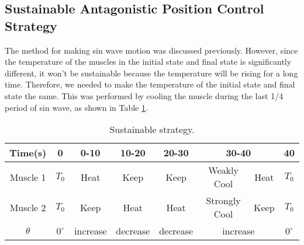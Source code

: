 


\subsection{Sustainable Antagonistic Position Control Strategy}\label{section_simulation}
The method for making sin wave motion was discussed previously. However, since the temperature of the muscles in the initial state and final state is significantly different, it won't be sustainable because the temperature will be rising for a long time. Therefore, we needed to make the temperature of the initial state and final state the same. This was performed by cooling the muscle during the last 1/4 period of sin wave, as shown in Table \ref{table_apc_sustain}.

\begin{table}[t]
	\caption{Sustainable \apc strategy.}
	\label{table_apc_sustain}
	\begin{center}
		\begin{tabular}{c||c|c|c|c|c|c|c}
			\hline
			Time(s) & 0 & 0-10 & 10-20 & 20-30 & \multicolumn{2}{|c|}{30-40} & 40 \\
			\hline
			Muscle 1 & $T_0$ & Heat & Keep & Keep & Weakly Cool & Heat & $T_0$ \\
			Muscle 2 & $T_0$ & Keep & Heat & Heat & Strongly Cool & Keep & $T_0$ \\
			\hline
			$\theta$ & $0^{\circ}$ & increase & decrease & decrease & \multicolumn{2}{|c|}{increase} & $0^{\circ}$ \\
			\hline
		\end{tabular}
	\end{center}
\end{table}

